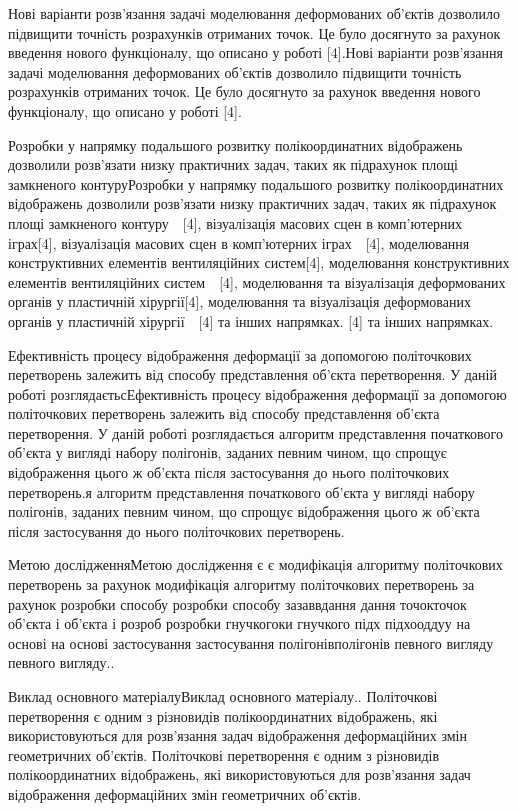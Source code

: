 \documentclass[12pt,a4paper]{article}
\begin{document}
\par
Нові варіанти розв’язання задачі моделювання деформованих об’єктів дозволило підвищити точність розрахунків отриманих точок. Це було досягнуто за рахунок введення нового функціоналу, що описано у роботі [4].Нові варіанти розв’язання задачі моделювання деформованих об’єктів дозволило підвищити точність розрахунків отриманих точок. Це було досягнуто за рахунок введення нового функціоналу, що описано у роботі [4].
\par
Розробки у напрямку подальшого розвитку полікоординатних відображень дозволили розв’язати низку практичних задач, таких як підрахунок площі замкненого контуруРозробки у напрямку подальшого розвитку полікоординатних відображень дозволили розв’язати низку практичних задач, таких як підрахунок площі замкненого контуру  [4], візуалізація масових сцен в комп’ютерних іграх[4], візуалізація масових сцен в комп’ютерних іграх  [4], моделювання конструктивних елементів вентиляційних систем[4], моделювання конструктивних елементів вентиляційних систем  [4], моделювання та візуалізація деформованих органів у пластичній хірургії[4], моделювання та візуалізація деформованих органів у пластичній хірургії  [4] та інших напрямках. [4] та інших напрямках.
\par
Ефективність процесу відображення деформації за допомогою політочкових перетворень залежить від способу представлення об’єкта перетворення. У даній роботі розглядаєтьсЕфективність процесу відображення деформації за допомогою політочкових перетворень залежить від способу представлення об’єкта перетворення. У даній роботі розглядається алгоритм представлення початкового об’єкта у вигляді набору полігонів, заданих певним чином, що спрощує відображення цього ж об’єкта після застосування до нього політочкових перетворень.я алгоритм представлення початкового об’єкта у вигляді набору полігонів, заданих певним чином, що спрощує відображення цього ж об’єкта після застосування до нього політочкових перетворень.
\par
Метою дослідженняМетою дослідження є є модифікація алгоритму політочкових перетворень за рахунок  модифікація алгоритму політочкових перетворень за рахунок   розробки способу розробки способу зазаввдання дання точокточок об’єкта і об’єкта і розроб розробки гнучкогоки гнучкого підх підхооддуу  на основі на основі застосування застосування полігонівполігонів певного вигляду певного вигляду..
\par
Виклад основного матеріалуВиклад основного матеріалу..  Політочкові перетворення є одним з різновидів полікоординатних відображень, які використовуються для розв’язання задач відображення деформаційних змін геометричних об’єктів. Політочкові перетворення є одним з різновидів полікоординатних відображень, які використовуються для розв’язання задач відображення деформаційних змін геометричних об’єктів.
\end{document}
